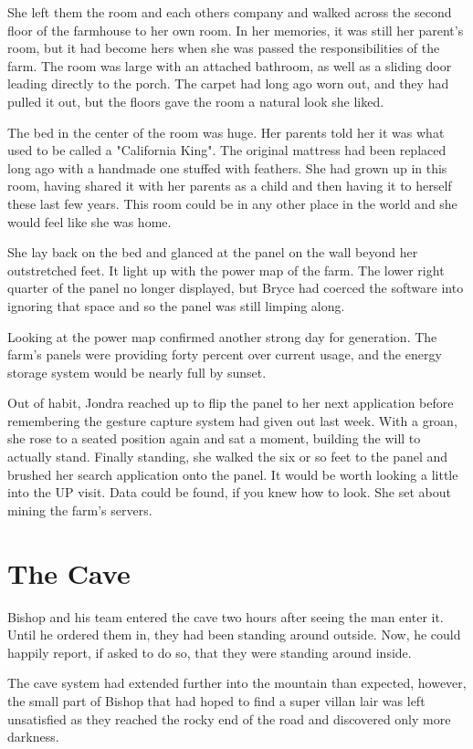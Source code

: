 \documentclass[courier]{sffms}
\begin{document}
She left them the room and each others company
and walked across the second floor of the
farmhouse to her own room. In her memories,
it was still her parent's room, but it had become
hers when she was passed the responsibilities of the
farm. The room was large with an attached
bathroom, as well as a sliding door leading
directly to the porch. The carpet had long ago
worn out, and they had pulled it out, but the
floors gave the room a natural look she liked.

The bed in the center of the room was huge.
Her parents told her it was what used to be
called a "California King". The original mattress
had been replaced long ago with a handmade
one stuffed with feathers. She had grown up
in this room, having shared it with her parents
as a child and then having it to herself these
last few years. This room could be in any other
place in the world and she would feel like she
was home.

She lay back on the bed and glanced at the 
panel on the wall beyond her outstretched feet.
It light up with the power map of the farm.
The lower right quarter of the panel no longer
displayed, but Bryce had coerced the software
into ignoring that space and so the panel
was still limping along.

Looking at the power map confirmed another
strong day for generation. The farm's panels
were providing forty percent over current
usage, and the energy storage system would
be nearly full by sunset.

Out of habit, Jondra reached up to flip the
panel to her next application before
remembering the gesture capture system
had given out last week. With a groan, she
rose to a seated position again and sat
a moment, building the will to actually
stand. Finally standing, she walked the
six or so feet to the panel and brushed
her search application onto the panel. It
would be worth looking a little into the
UP visit. Data could be found, if you knew
how to look. She set about mining the
farm's servers.

\chapter{The Cave}
Bishop and his team entered the cave two
hours after seeing the man enter it. Until
he ordered them in, they had been
standing around outside. Now, he could
happily report, if asked to do so, that they
were standing around inside.

The cave system had extended further
into the mountain than expected, however,
the small part of Bishop that had hoped
to find a super villan lair was left
unsatisfied as they reached the rocky end
of the road and discovered only more
darkness.
\end{document}
